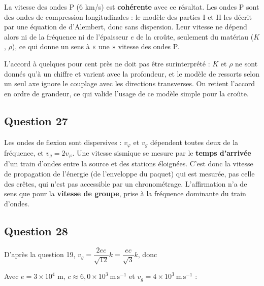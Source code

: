\documentclass[11pt,a4paper]{article}
\newcommand{\equationajustee}[1]{%
  \sbox{\boiteequation}{$\displaystyle #1$}%
  \ifdim\wd\boiteequation>\linewidth
    \[\resizebox{\linewidth}{!}{\usebox{\boiteequation}}\]%
  \else
    \[#1\]%
  \fi}
\begin{document}
La vitesse des ondes P (6 km/s) est \textbf{cohérente} avec ce résultat. Les ondes P sont des ondes de compression longitudinales : le modèle des parties I et II les décrit par une équation de d'Alembert, donc sans dispersion. Leur vitesse ne dépend alors ni de la fréquence ni de l'épaisseur \(e\) de la croûte, seulement du matériau (\(K\), \(\rho\)), ce qui donne un sens à « une » vitesse des ondes P.

L'accord à quelques pour cent près ne doit pas être surinterprété : \(K\) et \(\rho\) ne sont donnés qu'à un chiffre et varient avec la profondeur, et le modèle de ressorts selon un seul axe ignore le couplage avec les directions transverses. On retient l'accord en ordre de grandeur, ce qui valide l'usage de ce modèle simple pour la croûte.

\hypertarget{question-27}{%
\subsection{Question 27}\label{question-27}}

Les ondes de flexion sont dispersives : \(v_\varphi\) et \(v_g\) dépendent toutes deux de la fréquence, et \(v_g=2v_\varphi\). Une vitesse sismique se mesure par le \textbf{temps d'arrivée} d'un train d'ondes entre la source et des stations éloignées. C'est donc la vitesse de propagation de l'énergie (de l'enveloppe du paquet) qui est mesurée, pas celle des crêtes, qui n'est pas accessible par un chronométrage. L'affirmation n'a de sens que pour la \textbf{vitesse de groupe}, prise à la fréquence dominante du train d'ondes.

\hypertarget{question-28}{%
\subsection{Question 28}\label{question-28}}

D'après la question 19, \(v_g=\dfrac{2ec}{\sqrt{12}}k=\dfrac{ec}{\sqrt3}k\), donc

\equationajustee{\begin{aligned}k&=\frac{\sqrt3\,v_g}{ec}\\\lambda&=\frac{2\pi}{k}=\frac{2\pi ec}{\sqrt3\,v_g}\end{aligned}}

Avec \(e=3\times10^4\) m, \(c\approx6{,}0\times10^{3}\ \mathrm{m\,s^{-1}}\) et \(v_g=4\times10^{3}\ \mathrm{m\,s^{-1}}\) :

\equationajustee{k=\frac{1{,}73\times4\times10^{3}}{3\times10^{4}\times6\times10^{3}}\approx3{,}9\times10^{-5}\ \mathrm{m^{-1}}}
\end{document}
